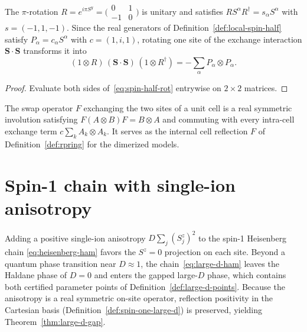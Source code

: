 \begin{lemma}
  \label{lem:spin-half-rotation}
  \leanok
  The \(\pi\)-rotation \(R = e^{i\pi S^y} = \bigl(\begin{smallmatrix} 0 & 1 \\ -1 & 0
  \end{smallmatrix}\bigr)\)
  is unitary and satisfies \(R S^\alpha R^\dagger = s_\alpha S^\alpha\) with \(s = (-1, 1, -1)\).
  Since the real generators of Definition~\ref{def:local-spin-half} satisfy
  \(P_\alpha = c_\alpha S^\alpha\) with \(c = (1, i, 1)\), rotating one site of the exchange
  interaction \(\mathbf S \cdot \mathbf S\) transforms it into
  \begin{equation}
    \label{eq:spin-half-rot}
    (1 \otimes R)\,(\mathbf S \cdot \mathbf S)\,(1 \otimes R^\dagger)
    = -\sum_\alpha P_\alpha \otimes P_\alpha.
  \end{equation}
\end{lemma}
\begin{proof}
  \leanok
  Evaluate both sides of~\eqref{eq:spin-half-rot} entrywise on \(2 \times 2\) matrices.
\end{proof}

\begin{definition}
  \label{def:cell-swap}
  \leanok
  The swap operator \(F\) exchanging the two sites of a unit cell is a real symmetric involution
  satisfying \(F (A \otimes B) F = B \otimes A\) and commuting with every intra-cell exchange term
  \(c \sum_k A_k \otimes A_k\). It serves as the internal cell reflection \(F\) of
  Definition~\ref{def:rpring} for the dimerized models.
\end{definition}

\section{Spin-1 chain with single-ion anisotropy}

Adding a positive single-ion anisotropy \(D \sum_j (S_j^z)^2\) to the spin-1 Heisenberg chain
\eqref{eq:heisenberg-ham} favors the \(S^z = 0\) projection on each site. Beyond a quantum phase
transition near \(D \approx 1\), the chain~\eqref{eq:large-d-ham} leaves the Haldane phase of
\(D = 0\) and enters the gapped large-\(D\) phase, which contains both certified parameter points
of Definition~\ref{def:large-d-points}. Because the anisotropy is a real symmetric on-site
operator, reflection positivity in the Cartesian basis (Definition~\ref{def:spin-one-large-d}) is
preserved, yielding Theorem~\ref{thm:large-d-gap}.

